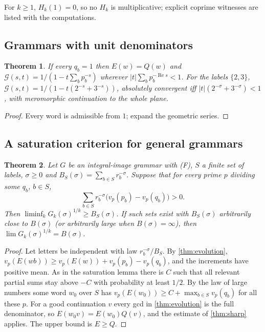 \documentclass[11pt,a4paper]{article}
\newtheorem{theorem}{Theorem}[section]
\begin{document}
For \(k\ge1\), \(H_k(1)=0\), so no \(H_k\) is multiplicative; explicit
coprime witnesses are listed with the computations.

\subsection{Grammars with unit
denominators}

\begin{theorem}\label{thm:unit}
If every \(q_b=1\) then \(E(w)=Q(w)\) and
\(\mathcal G(s,t)=1/(1-t\sum_bp_b^{-s})\) wherever
\(|t|\sum_bp_b^{-\operatorname{Re}s}<1\). For the labels \(\{2,3\}\),
\(\mathcal G(s,t)=1/(1-t(2^{-s}+3^{-s}))\), absolutely convergent iff
\(|t|(2^{-\sigma}+3^{-\sigma})<1\), with meromorphic continuation to the
whole plane.

\end{theorem}

\begin{proof}

Every word is admissible from \(1\); expand the geometric series.

\end{proof}

\subsection{A saturation criterion for general
grammars}

\begin{theorem}\label{thm:criterion}
Let \(G\) be an integral-image grammar with (F), \(S\) a finite set of
labels, \(\sigma\ge0\) and \(B_S(\sigma)=\sum_{b\in S}r_b^{-\sigma}\).
Suppose that for every prime \(p\) dividing some \(q_b\), \(b\in S\),
\[\sum_{b\in S}r_b^{-\sigma}\big(v_p(p_b)-v_p(q_b)\big)>0 .\] Then
\(\liminf_kG_k(\sigma)^{1/k}\ge B_S(\sigma)\). If such sets exist with
\(B_S(\sigma)\) arbitrarily close to \(B(\sigma)\) (or arbitrarily large
when \(B(\sigma)=\infty\)), then \(\lim G_k(\sigma)^{1/k}=B(\sigma)\).

\end{theorem}

\begin{proof}

Let letters be independent with law \(r_b^{-\sigma}/B_S\). By \cref{thm:evolution},
\(v_p(E(wb))\ge v_p(E(w))+v_p(p_b)-v_p(q_b)\), and the increments have
positive mean. As in the saturation lemma there is \(C\) such that all
relevant partial sums stay above \(-C\) with probability at least
\(1/2\). By the law of large numbers some word \(w_0\) over \(S\) has
\(v_p(E(w_0))\ge C+\max_{b\in S}v_p(q_b)\) for all these \(p\). For a
good continuation \(v\) every gcd in \cref{thm:evolution} is the full denominator, so
\(E(w_0v)=E(w_0)Q(v)\), and the estimate of \cref{thm:sharp} applies. The upper bound
is \(E\ge Q\).

\end{proof}
\end{document}
